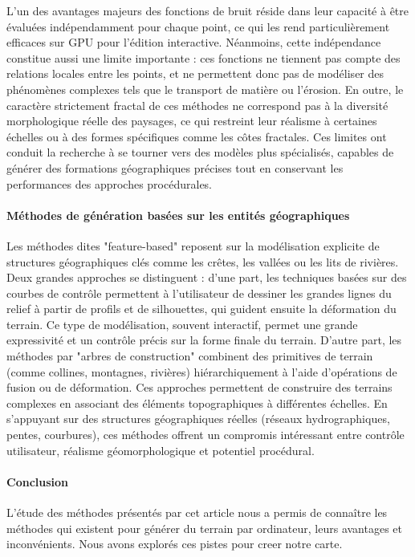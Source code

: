 L’un des avantages majeurs des fonctions de bruit réside dans leur capacité à être évaluées indépendamment pour chaque point, ce qui les rend particulièrement efficaces sur GPU pour l’édition interactive. Néanmoins, cette indépendance constitue aussi une limite importante : ces fonctions ne tiennent pas compte des relations locales entre les points, et ne permettent donc pas de modéliser des phénomènes complexes tels que le transport de matière ou l’érosion. En outre, le caractère strictement fractal de ces méthodes ne correspond pas à la diversité morphologique réelle des paysages, ce qui restreint leur réalisme à certaines échelles ou à des formes spécifiques comme les côtes fractales. Ces limites ont conduit la recherche à se tourner vers des modèles plus spécialisés, capables de générer des formations géographiques précises tout en conservant les performances des approches procédurales.

\paragraph{Méthodes de génération basées sur les entités géographiques}

Les méthodes dites "feature-based" reposent sur la modélisation explicite de structures géographiques clés comme les crêtes, les vallées ou les lits de rivières. Deux grandes approches se distinguent : d'une part, les techniques basées sur des courbes de contrôle permettent à l’utilisateur de dessiner les grandes lignes du relief à partir de profils et de silhouettes, qui guident ensuite la déformation du terrain. Ce type de modélisation, souvent interactif, permet une grande expressivité et un contrôle précis sur la forme finale du terrain. D’autre part, les méthodes par "arbres de construction" combinent des primitives de terrain (comme collines, montagnes, rivières) hiérarchiquement à l’aide d’opérations de fusion ou de déformation. Ces approches permettent de construire des terrains complexes en associant des éléments topographiques à différentes échelles. En s’appuyant sur des structures géographiques réelles (réseaux hydrographiques, pentes, courbures), ces méthodes offrent un compromis intéressant entre contrôle utilisateur, réalisme géomorphologique et potentiel procédural.


\paragraph{Conclusion}
L'étude des méthodes présentés par cet article nous a permis de connaître les méthodes qui existent pour générer du terrain par ordinateur, leurs avantages et inconvénients. Nous avons explorés ces pistes pour creer notre carte.